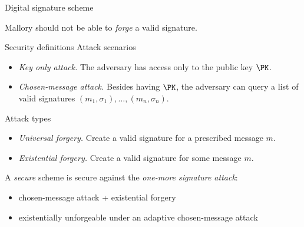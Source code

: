 \begin{frame}{Digital signature scheme}
  \pause
  \begin{center}
  \end{center}

  \pause
  Mallory should not be able to \emph{forge} a valid signature.
\end{frame}

\begin{frame}{Security definitions}
  Attack scenarios
  \begin{itemize}[<+(1)->]
    \item \emph{Key only attack.}
    The adversary has access only to the public key $\PK$.
    \item \emph{Chosen-message attack.}
    Besides having $\PK$, the adversary can query a list of valid signatures $(m_1, \sigma_1), \dots, (m_n, \sigma_n)$.
  \end{itemize}

  \pause
  Attack types
  \begin{itemize}[<+(1)->]
    \item \emph{Universal forgery.}
    Create a valid signature for a prescribed message $m$.
    \item \emph{Existential forgery.}
    Create a valid signature for some message $m$.
  \end{itemize}

  \pause
  A \emph{secure} scheme is secure against the \emph{one-more signature attack}:
  \begin{itemize}[<+(1)->]
    \item chosen-message attack + existential forgery
    \item existentially unforgeable under an adaptive chosen-message attack
  \end{itemize}
\end{frame}

